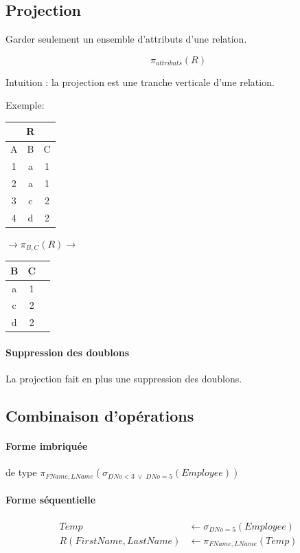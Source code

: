 \documentclass[a4paper]{article}
\begin{document}
  \subsection{Projection}
  Garder seulement un ensemble d'attributs d'une relation.

  $$ \pi_{attributs}(R) $$

  Intuition : la projection est une tranche verticale d'une relation.

    Exemple:
  \begin{tabular}{|c|c|c|}
	\multicolumn{3}{c}{R}\\
	\hline
	A & B & C\\
	\hline\hline
	1 & a & 1\\
	2 & a & 1\\
	3 & c & 2\\
	4 & d & 2\\
	\hline
  \end{tabular}
  $\rightarrow \pi_{B,C}(R) \rightarrow$
  \begin{tabular}{|c|c|c|}
	\hline
	B & C\\
	\hline\hline
	a & 1\\
	c & 2\\
	d & 2\\
	\hline
  \end{tabular}
  
  \paragraph{Suppression des doublons}
  La projection fait en plus une suppression des doublons.

  \subsection{Combinaison d'opérations}

  \paragraph{Forme imbriquée} de type $ \pi_{FName, LName}(\sigma_{DNo<3\; \lor\; DNo=5 }(Employee))$

  \paragraph{Forme séquentielle}
  \begin{align*}
    Temp &\leftarrow \sigma_{DNo=5}(Employee)\\
    R(FirstName, LastName) &\leftarrow \pi_{FName, LName}(Temp)
  \end{align*}
\end{document}

